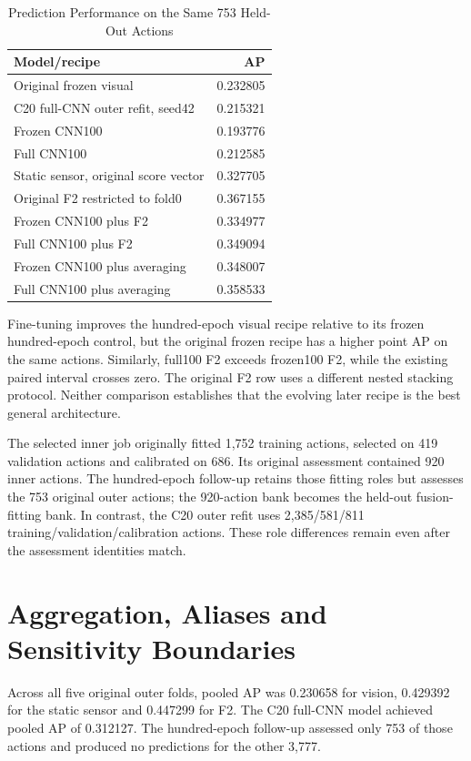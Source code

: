 \begin{table}[htbp]
\caption{Prediction Performance on the Same 753 Held-Out Actions}\label{tab:753-supplement}
\centering\small

\begin{tabular}{lr}\toprule Model/recipe&AP\\\midrule
Original frozen visual&0.232805\\
C20 full-CNN outer refit, seed42&0.215321\\
Frozen CNN100&0.193776\\
Full CNN100&0.212585\\
Static sensor, original score vector&0.327705\\
Original F2 restricted to fold0&0.367155\\
Frozen CNN100 plus F2&0.334977\\
Full CNN100 plus F2&0.349094\\
Frozen CNN100 plus averaging&0.348007\\
Full CNN100 plus averaging&0.358533\\\bottomrule
\end{tabular}
\end{table}

Fine-tuning improves the hundred-epoch visual recipe relative to its frozen
hundred-epoch control, but the original frozen recipe has a higher point AP on the same
actions. Similarly, full100 F2 exceeds frozen100 F2, while the existing paired interval
crosses zero. The original F2 row uses a different nested stacking protocol. Neither
comparison establishes that the evolving later recipe is the best general architecture.

The selected inner job originally fitted 1,752 training actions, selected on 419
validation actions and calibrated on 686. Its original assessment contained 920 inner
actions. The hundred-epoch follow-up retains those fitting roles but assesses the 753
original outer actions; the 920-action bank becomes the held-out fusion-fitting bank. In
contrast, the C20 outer refit uses 2,385/581/811 training/validation/calibration
actions. These role differences remain even after the assessment identities match.

\section{Aggregation, Aliases and Sensitivity Boundaries}
Across all five original outer folds, pooled AP was 0.230658 for vision, 0.429392 for
the static sensor and 0.447299 for F2. The C20 full-CNN model achieved pooled AP of
0.312127. The hundred-epoch follow-up assessed only 753 of those actions and produced no
predictions for the other 3,777.

